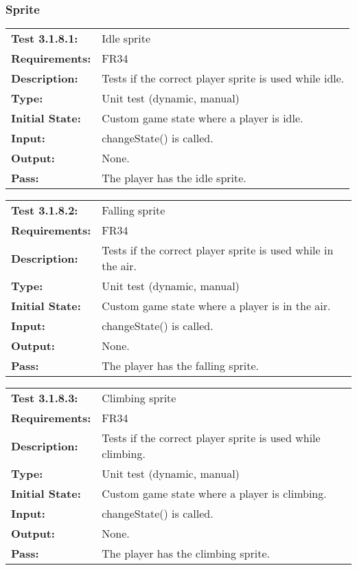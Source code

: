 \documentclass[12pt, titlepage]{article}
\begin{document}
\subsubsection{Sprite}

\begin{tabular}{|l|p{10cm}|}
    \hline
    \bf{Test} 3.1.8.1: & Idle sprite \\
    \bf{Requirements}: & FR34 \\
    \bf{Description}: & Tests if the correct player sprite is used while idle. \\
    \bf{Type}: & Unit test (dynamic, manual) \\
    \bf{Initial State}: & Custom game state where a player is idle. \\
    \bf{Input}: & changeState() is called. \\
    \bf{Output}: & None. \\
    \bf{Pass}: & The player has the idle sprite. \\
    \hline
\end{tabular}

\begin{tabular}{|l|p{10cm}|}
    \hline
    \bf{Test} 3.1.8.2: & Falling sprite \\
    \bf{Requirements}: & FR34 \\
    \bf{Description}: & Tests if the correct player sprite is used while in the air. \\
    \bf{Type}: & Unit test (dynamic, manual) \\
    \bf{Initial State}: & Custom game state where a player is in the air. \\
    \bf{Input}: & changeState() is called. \\
    \bf{Output}: & None. \\
    \bf{Pass}: & The player has the falling sprite. \\
    \hline
\end{tabular}

\begin{tabular}{|l|p{10cm}|}
    \hline
    \bf{Test} 3.1.8.3: & Climbing sprite \\
    \bf{Requirements}: & FR34 \\
    \bf{Description}: & Tests if the correct player sprite is used while climbing. \\
    \bf{Type}: & Unit test (dynamic, manual) \\
    \bf{Initial State}: & Custom game state where a player is climbing. \\
    \bf{Input}: & changeState() is called. \\
    \bf{Output}: & None. \\
    \bf{Pass}: & The player has the climbing sprite. \\
    \hline
\end{tabular}
\end{document}
